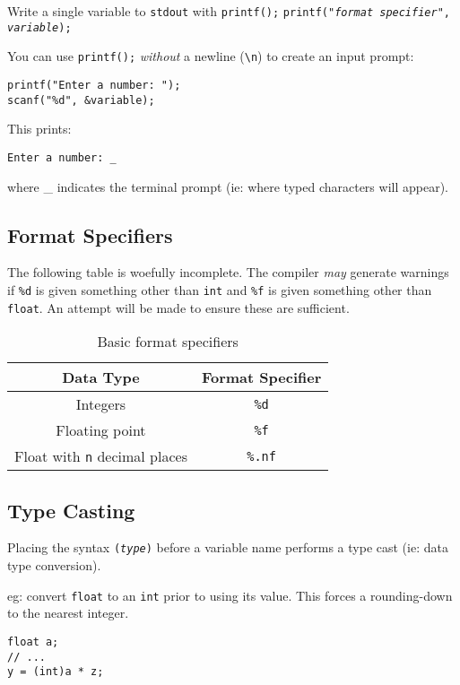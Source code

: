 \documentclass{lab}
\begin{document}
\begin{multicols}{2}
Write a single variable to \texttt{stdout} with \texttt{printf();}
\texttt{printf("\textit{format specifier}", \textit{variable});}

You can use \texttt{printf();} \textit{without} a newline (\texttt{\textbackslash n}) to create an input prompt:

\begin{lstlisting}[style=CStyle]
printf("Enter a number: ");
scanf("%d", &variable);
\end{lstlisting}

This prints:

\texttt{Enter a number: \_}

where \_ indicates the terminal prompt (ie: where typed characters will appear).

\subsection{Format Specifiers}
The following table is woefully incomplete. The compiler \textit{may} generate warnings if \texttt{\%d} is given something other than \texttt{int} and \texttt{\%f} is given something other than \texttt{float}. An attempt will be made to ensure these are sufficient.
\begin{table}[H]
\centering
\begin{tabular}{|c|c|}
\hline
Data Type & Format Specifier \\
\hline
Integers & \texttt{\%d} \\
Floating point & \texttt{\%f} \\
Float with \texttt{n} decimal places & \texttt{\%.nf} \\
\hline
\end{tabular}
\caption{Basic format specifiers}
\end{table}

\subsection{Type Casting}
Placing the syntax \texttt{(\textit{type})} before a variable name performs a type cast (ie: data type conversion).

eg: convert \texttt{float} to an \texttt{int} prior to using its value. This forces a rounding-down to the nearest integer.

\begin{lstlisting}[style=CStyle]
float a;
// ...
y = (int)a * z;
\end{lstlisting}


\end{multicols}
\end{document}
